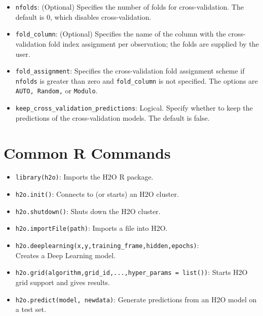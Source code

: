 {{\begin{itemize}
\item \texttt{nfolds}: (Optional) Specifies the number of folds for cross-validation. %
The default is 0, which disables cross-validation.

\item \texttt{fold\_column}: (Optional) Specifies the name of the column with the cross-validation fold index assignment per observation; the folds are supplied by the user. 

\item \texttt{fold\_assignment}: Specifies the cross-validation fold assignment scheme if \texttt{nfolds} is greater than zero and \texttt{fold\_column} is not specified. The options are \texttt{AUTO, Random,} or \texttt{Modulo}. 

\item \texttt{keep\_cross\_validation\_predictions}: Logical.  Specify whether to keep the predictions of the cross-validation models.  The default is false.

\end{itemize}

\section{Common R Commands}
\begin{itemize}

\item \texttt{library(h2o)}: Imports the H2O R package.

\item \texttt{h2o.init()}:  Connects to (or starts) an H2O cluster.

\item \texttt{h2o.shutdown()}: Shuts down the H2O cluster.

\item \texttt{h2o.importFile(path)}: Imports a file into H2O.

\item \texttt{h2o.deeplearning(x,y,training\_frame,hidden,epochs)}:\\ Creates a Deep Learning model.

\item \texttt{h2o.grid(algorithm,grid\_id,...,hyper\_params = list())}: Starts H2O grid support and gives results.

\item \texttt{h2o.predict(model, newdata)}: Generate predictions from an H2O model on a test set.


\end{itemize}}}
